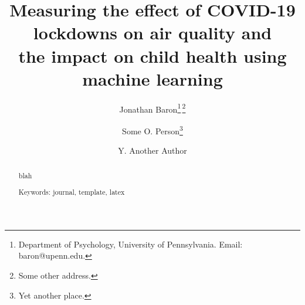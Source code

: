 \documentclass[9pt,twocolumn]{article}
\begin{document}
\sloppy
\title{\Large{\textbf{
Measuring the effect of COVID-19 lockdowns on air quality and\\
the impact on child health using machine learning
}}}

\author{
Jonathan Baron\thanks{Department of Psychology, University of
  Pennsylvania. Email: baron@upenn.edu.}\;\,\thanks{Some other address.}
\and 
  Some O. Person\thanks{Yet another place.} 
\and
  Y. Another Author\footnotemark[2] %
}

\date{} %
\maketitle

\begin{abstract}

blah\smallskip
\noindent

Keywords: journal, template, latex

\end{abstract}

%
%







\end{document}
